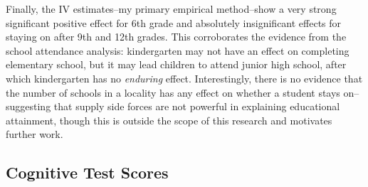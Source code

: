 Finally, the IV estimates--my primary empirical method--show a very strong significant positive effect for 6th grade and absolutely insignificant effects for staying on after 9th and 12th grades. This corroborates the evidence from the school attendance analysis: kindergarten may not have an effect on completing elementary school, but it may lead children to attend junior high school, after which kindergarten has no \textit{enduring} effect. Interestingly, there is no evidence that the number of schools in a locality has any effect on whether a student stays on--suggesting that supply side forces are not powerful in explaining educational attainment, though this is outside the scope of this research and motivates further work.

\subsection{Cognitive Test Scores}

